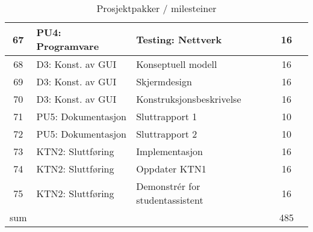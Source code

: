 \begin{table}
{\begin{tabularx}{1.3\textwidth}{|c|l|X|c|c|}
	67 & PU4: Programvare & Testing: Nettverk & 16 & \\ \hline
	68 & D3: Konst. av GUI & Konseptuell modell & 16 & \\ \hline
	69 & D3: Konst. av GUI & Skjermdesign & 16 & \\ \hline
	70 & D3: Konst. av GUI & Konstruksjonsbeskrivelse & 16 & \\ \hline
	71 & PU5: Dokumentasjon & Sluttrapport  1& 10 & \\ \hline
	72 & PU5: Dokumentasjon & Sluttrapport  2& 10 & \\ \hline
	73 & KTN2: Sluttføring & Implementasjon & 16 & \\ \hline
	74 & KTN2: Sluttføring & Oppdater KTN1 & 16 & \\ \hline
	75 & KTN2: Sluttføring & Demonstrér for studentassistent & 16 & \\ \hline
	sum & & & 485 & \\ \hline \hline
	\end{tabularx}}
\caption {Prosjektpakker / milesteiner}
\end{table}

